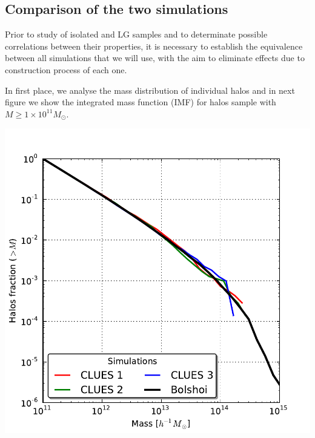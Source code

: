 \documentclass[usenatbib]{latex/mn2e}
\begin{document}
\subsection{Comparison of the two simulations}
\label{subsec:comparison_simulations}


Prior to study of isolated and LG samples and to determinate possible 
correlations between their properties, it is necessary to establish the 
equivalence between all simulations that we will use, with the aim to 
eliminate effects due to construction process of each one.


In first place, we analyse the mass distribution of individual halos and 
in next figure we show the integrated mass function (IMF) for halos sample
with $M \geq 1\times 10^{11} M_{\odot}$.


\begin{flushleft}
\begin{center}

\includegraphics[keepaspectratio=true,width=0.35\textheight]
{./figures/Halos_IMF.pdf}


\label{fig:IMF_Halos}
\vspace{0.1 cm}
\end{center}
\end{flushleft}
\end{document}
